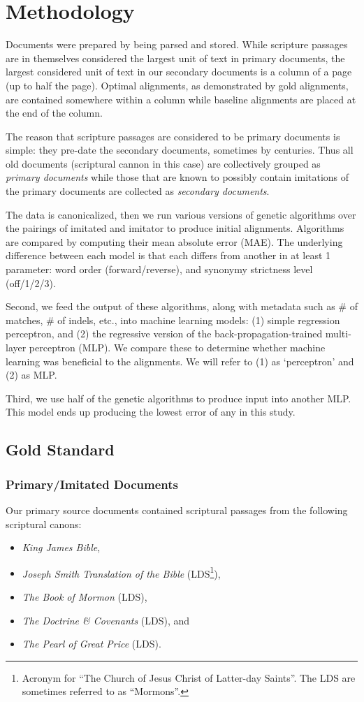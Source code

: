\section {Methodology}
Documents were prepared by being parsed and stored. While scripture passages are in themselves considered the largest unit of text in primary documents, the largest considered unit of text in our secondary documents is a column of a page (up to half the page). Optimal alignments, as demonstrated by gold alignments, are contained somewhere within a column while baseline alignments are placed at the end of the column.

The reason that scripture passages are considered to be primary documents is simple: they pre-date the secondary documents, sometimes by centuries. Thus all old documents (scriptural cannon in this case) are collectively grouped as \textit{primary documents} while those that are known to possibly contain imitations of the primary documents are collected as \textit{secondary documents}.

The data is canonicalized, then we run various versions of genetic algorithms over the pairings of imitated and imitator to produce initial alignments. Algorithms are compared by computing their mean absolute error (MAE).
The underlying difference between each model is that each differs from another in at least 1 parameter: word order (forward/reverse), and synonymy strictness level (off/1/2/3).

Second, we feed the output of these algorithms, along with metadata such as \# of matches, \# of indels, etc., into machine learning models: (1) simple regression perceptron, and (2) the regressive version of the back-propagation-trained multi-layer perceptron (MLP). We compare these to determine whether machine learning was beneficial to the alignments. We will refer to (1) as `perceptron' and (2) as MLP.

Third, we use half of the genetic algorithms to produce input into another MLP. This model ends up producing the lowest error of any in this study.

\subsection{Gold Standard}
\subsubsection{Primary/Imitated Documents}
Our primary source documents contained scriptural passages from the following scriptural canons:
	\begin{itemize}
		\item \textit{King James Bible},
		\item \textit{Joseph Smith Translation of the Bible} (LDS\footnote{Acronym for ``The Church of Jesus Christ of Latter-day Saints''. The LDS are sometimes referred to as ``Mormons''.}),
		\item \textit{The Book of Mormon} (LDS),
		\item \textit{The Doctrine \& Covenants} (LDS), and
		\item \textit{The Pearl of Great Price} (LDS). 
	\end{itemize}

